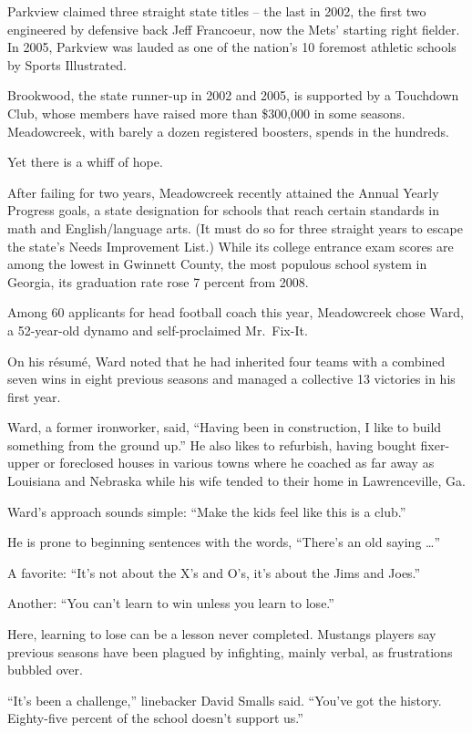 ﻿\documentclass[12pt]{article}
\begin{document}
Parkview claimed three straight state titles -- the last in 2002, the first two engineered by
defensive back Jeff Francoeur, now the Mets' starting right fielder. In 2005, Parkview was lauded as
one of the nation's 10 foremost athletic schools by Sports Illustrated.

Brookwood, the state runner-up in 2002 and 2005, is supported by a Touchdown Club, whose members
have raised more than \$300,000 in some seasons. Meadowcreek, with barely a dozen registered
boosters, spends in the hundreds.

Yet there is a whiff\cite{whiff} of hope.

After failing for two years, Meadowcreek recently attained the Annual Yearly Progress goals, a state
designation for schools that reach certain standards in math and English/language arts. (It must do
so for three straight years to escape the state's Needs Improvement List.) While its college
entrance exam scores are among the lowest in Gwinnett County, the most populous school system in
Georgia, its graduation rate rose 7 percent from 2008.

Among 60 applicants for head football coach this year, Meadowcreek chose Ward, a 52-year-old dynamo
and self-proclaimed Mr.~Fix-It.

On his r\'esum\'e, Ward noted that he had inherited four teams with a combined seven wins in eight
previous seasons and managed a collective 13 victories in his first year.

Ward, a former ironworker, said, ``Having been in construction, I like to build something from the
ground up.'' He also likes to refurbish\cite{refurbish}, having bought fixer-upper or foreclosed
houses in various towns where he coached as far away as Louisiana and Nebraska while his wife tended
to their home in Lawrenceville, Ga.

Ward's approach sounds simple: ``Make the kids feel like this is a club.''

He is prone to beginning sentences with the words, ``There's an old saying \ldots''

A favorite: ``It's not about the X's and O's, it's about the Jims and Joes.''

Another: ``You can't learn to win unless you learn to lose.''

Here, learning to lose can be a lesson never completed. Mustangs players say previous seasons have
been plagued by infighting, mainly verbal, as frustrations bubbled over.

``It's been a challenge,'' linebacker David Smalls said. ``You've got the history. Eighty-five
percent of the school doesn't support us.''
\end{document}
